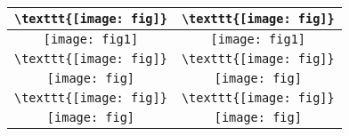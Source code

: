 \documentclass{article}
\begin{document}
\begin{tabular}{|c|c|}\hline
	\verb+\texttt{[image: fig]}+
	& \verb+\texttt{[image: fig]}+ \\ \hline
	\texttt{[image: fig1]}
	& \texttt{[image: fig1]} \\ \hline
	\verb+\texttt{[image: fig]}+
	& \verb+\texttt{[image: fig]}+ \\ \hline
	\texttt{[image: fig]}
	& \texttt{[image: fig]} \\ \hline
	\verb+\texttt{[image: fig]}+
	& \verb+\texttt{[image: fig]}+ \\ \hline
	\texttt{[image: fig]}
	& \texttt{[image: fig]} \\ \hline
\end{tabular}
\end{document}
